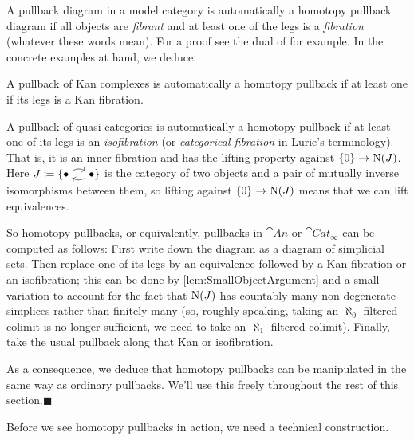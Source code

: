 \begin{numpar}\label{par:HomotopyPullback}
	A pullback diagram in a model category is automatically a homotopy pullback diagram if all objects are \emph{fibrant} and at least one of the legs is a \emph{fibration} (whatever these words mean). For a proof see the dual of \cite[Proposition~{\href{https://cisinski.app.uni-regensburg.de/CatLR.pdf\#thm.2.3.27}{2.3.27}}]{Cisinski} for example. In the concrete examples at hand, we deduce:
	\begin{alphanumerate}
		\item A pullback of Kan complexes is automatically a homotopy pullback if at least one if its legs is a Kan fibration.\label{enum:HomotopyPullbackOfKanComplexes}
		\item A pullback of quasi-categories is automatically a homotopy pullback if at least one of its legs is an \emph{isofibration} (or \emph{categorical fibration} in Lurie's terminology). That is, it is an inner fibration and has the lifting property against $\{0\}\rightarrow \operatorname{N}(J)$. Here $J\coloneqq \{\InlineJ\}$ is the category of two objects and a pair of mutually inverse isomorphisms between them, so lifting against $\{0\}\rightarrow \operatorname{N}(J)$ means that we can lift equivalences.\label{enum:HomotopyPullbackOfQuasicategories}
	\end{alphanumerate}
	So homotopy pullbacks, or equivalently, pullbacks in $\cat{An}$ or $\cat{Cat}_\infty$ can be computed as follows: First write down the diagram as a diagram of simplicial sets. Then replace one of its legs by an equivalence followed by a Kan fibration or an isofibration; this can be done by \cref{lem:SmallObjectArgument} and a small variation to account for the fact that $\operatorname{N}(J)$ has countably many non-degenerate simplices rather than finitely many (so, roughly speaking, taking an $\aleph_0$-filtered colimit is no longer sufficient, we need to take an $\aleph_1$-filtered colimit). Finally, take the usual pullback along that Kan or isofibration.
	
	As a consequence, we deduce that homotopy pullbacks can be manipulated in the same way as ordinary pullbacks. We'll use this freely throughout the rest of this section.\hfill$\blacksquare$
\end{numpar}
Before we see homotopy pullbacks in action, we need a technical construction.
